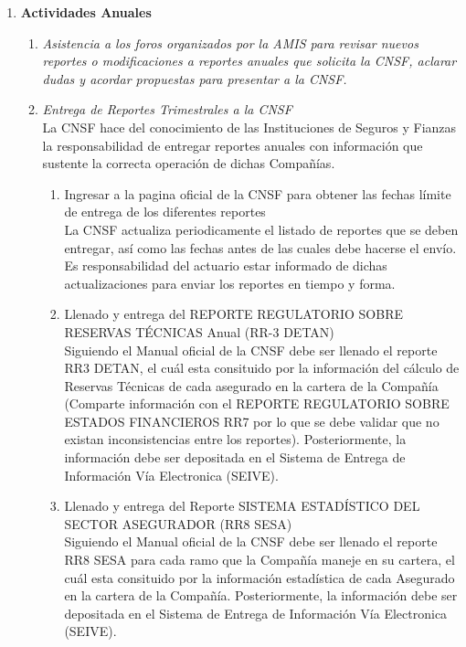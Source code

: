 \documentclass[11pt,twoside,openright,spanish]{report}
\numberwithin{equation}{chapter}
\numberwithin{figure}{chapter}
\numberwithin{table}{chapter}
\begin{document}
\begin{singlespace}
\begin{enumerate}
\begin{enumerate}
\end{enumerate}
\item \textbf{Actividades Anuales}
\begin{enumerate}
	\item \textit{Asistencia a los foros organizados por la AMIS para revisar nuevos reportes o modificaciones a reportes anuales que solicita la CNSF, aclarar dudas y acordar propuestas para presentar a la CNSF.} \\ \-\hspace{0.5cm}
		\item \textit{Entrega de Reportes Trimestrales a la CNSF} \\ \-\hspace{0.5cm}
	La CNSF hace del conocimiento de las Instituciones de Seguros y Fianzas la responsabilidad de entregar reportes anuales con información que sustente la correcta operación de dichas Compañías.
	\begin{enumerate}
		\item {Ingresar a la pagina oficial de la CNSF para obtener las fechas límite de entrega de los diferentes reportes} \\ \-\hspace{0.5cm}
		La CNSF actualiza periodicamente el listado de reportes que se deben entregar, así como las fechas antes de las cuales debe hacerse el envío. Es responsabilidad del actuario estar informado de dichas actualizaciones para enviar los reportes en tiempo y forma.
		\item {Llenado y entrega del REPORTE REGULATORIO SOBRE RESERVAS TÉCNICAS Anual (RR-3 DETAN)} \\ \-\hspace{0.5cm}
		Siguiendo el Manual oficial de la CNSF debe ser llenado el reporte RR3 DETAN, el cuál esta consituido por la información del cálculo de Reservas Técnicas de cada asegurado en la cartera de la Compañía (Comparte información con el REPORTE REGULATORIO SOBRE ESTADOS FINANCIEROS RR7 por lo que se debe validar que no existan inconsistencias entre los reportes). Posteriormente, la información debe ser depositada en el Sistema de Entrega de Información Vía Electronica (SEIVE).
		\item {Llenado y entrega del Reporte SISTEMA ESTADÍSTICO DEL SECTOR ASEGURADOR (RR8 SESA)} \\ \-\hspace{0.5cm}
		Siguiendo el Manual oficial de la CNSF debe ser llenado el reporte RR8 SESA para cada ramo que la Compañía maneje en su cartera, el cuál esta consituido por la información estadística de cada Asegurado en la cartera de la Compañía. Posteriormente, la información debe ser depositada en el Sistema de Entrega de Información Vía Electronica (SEIVE).

\end{enumerate}
\end{enumerate}
\end{enumerate}
\end{singlespace}
\end{document}
